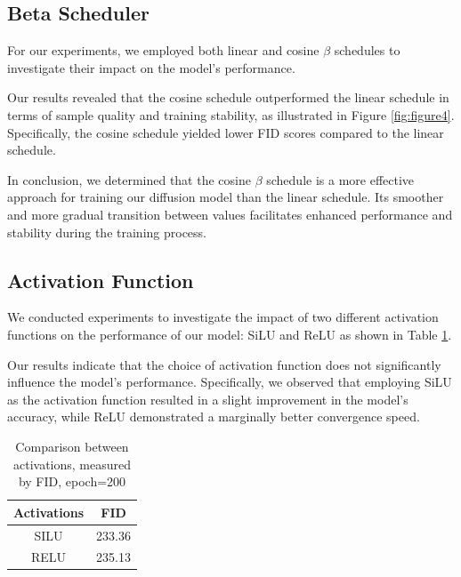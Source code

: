 \documentclass[letterpaper]{article} %
\begin{document}
\subsection{Beta Scheduler}
For our experiments, we employed both linear and cosine $\beta$ schedules to investigate their impact on the model's performance.

Our results revealed that the cosine schedule outperformed the linear schedule in terms of sample quality and training stability, as illustrated in Figure \ref{fig:figure4}. Specifically, the cosine schedule yielded lower FID scores compared to the linear schedule.

In conclusion, we determined that the cosine $\beta$ schedule is a more effective approach for training our diffusion model than the linear schedule. Its smoother and more gradual transition between values facilitates enhanced performance and stability during the training process.

\subsection{Activation Function}
We conducted experiments to investigate the impact of two different activation functions on the performance of our model: SiLU and ReLU as shown in Table \ref{tab:act}.

Our results indicate that the choice of activation function does not significantly influence the model's performance. Specifically, we observed that employing SiLU as the activation function resulted in a slight improvement in the model's accuracy, while ReLU demonstrated a marginally better convergence speed.

\begin{table}[t]
    \centering
    \begin{tabular}{c|c}
    \textbf{Activations} & \textbf{FID} \\
    \hline
            SILU  & 233.36 \\
            RELU  & 235.13
    \end{tabular}
    \caption{Comparison between activations, measured by FID, epoch=200}
    \label{tab:act}
    \end{table}
\end{document}
